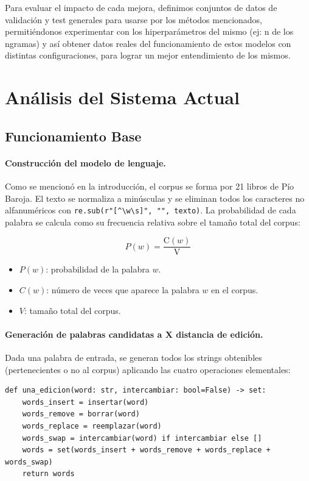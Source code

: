 \documentclass[12pt,a4paper]{article}
\begin{document}
Para evaluar el impacto de cada mejora, definimos conjuntos de datos de validación y test generales para usarse por los métodos mencionados, permitiéndonos experimentar con los hiperparámetros del mismo (ej: n de los ngramas) y así obtener datos reales del funcionamiento de estos modelos con distintas configuraciones, para lograr un mejor entendimiento de los mismos.

\section{Análisis del Sistema Actual}
\subsection{Funcionamiento Base}

\paragraph{Construcción del modelo de lenguaje.}
Como se mencionó en la introducción, el corpus se forma por 21 libros de Pío Baroja. El texto se normaliza a minúsculas y se eliminan todos los caracteres no alfanuméricos con \lstinline[language={}]|re.sub(r"[^\w\s]", "", texto)|. La probabilidad de cada palabra se calcula como su frecuencia relativa sobre el tamaño total del corpus:

\begin{equation}
    P(w) = \frac{\text{C}(w)}{\text{V}}
\end{equation}

\begin{itemize}
    \item $P(w)$: probabilidad de la palabra $w$.
    \item $C(w)$: número de veces que aparece la palabra $w$ en el corpus.
    \item $V$: tamaño total del corpus.
\end{itemize}

\paragraph{Generación de palabras candidatas a X distancia de edición.}
Dada una palabra de entrada, se generan todos los strings obtenibles (pertenecientes o no al corpus) aplicando las cuatro operaciones elementales:

\begin{lstlisting}
def una_edicion(word: str, intercambiar: bool=False) -> set:
    words_insert = insertar(word)
    words_remove = borrar(word)
    words_replace = reemplazar(word)
    words_swap = intercambiar(word) if intercambiar else []
    words = set(words_insert + words_remove + words_replace + words_swap)
    return words
\end{lstlisting}
\end{document}
